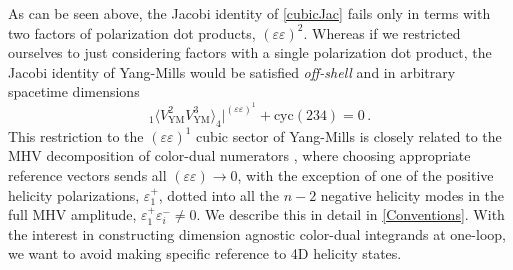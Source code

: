 \documentclass[11pt,letter]{article}
\begin{document}
As can be seen above, the Jacobi identity of \cref{cubicJac} fails
only in terms with two factors of polarization dot products,
$(\varepsilon\varepsilon)^2$. Whereas if we restricted ourselves to
just considering factors with a single polarization dot product, the
Jacobi identity of Yang-Mills would be satisfied \textit{off-shell}
and in arbitrary spacetime dimensions
\begin{equation}
{}_1\langle V^{2}_{\text{YM}}V^{3}_{\text{YM}}\rangle_4\big|^{(\varepsilon\varepsilon)^1}+\text{cyc}(234) =0\,.
\end{equation}
This restriction to the $(\varepsilon\varepsilon)^1$ cubic sector of Yang-Mills is closely related to the MHV decomposition of color-dual numerators \cite{TasiLance,ElvangHuangReview,Chen:2019ywi,Chen:2021chy}, where choosing appropriate reference vectors sends all $(\varepsilon\varepsilon) \rightarrow 0$, with the exception of one of the positive helicity polarizations, $\varepsilon^+_1$, dotted into all the $n-2$ negative helicity modes in the full MHV amplitude, $\varepsilon^+_1 \varepsilon^-_i \neq 0$. We describe this in detail in \cref{Conventions}. With the interest in constructing dimension agnostic color-dual integrands at one-loop, we want to avoid making specific reference to 4D helicity states.
\end{document}
